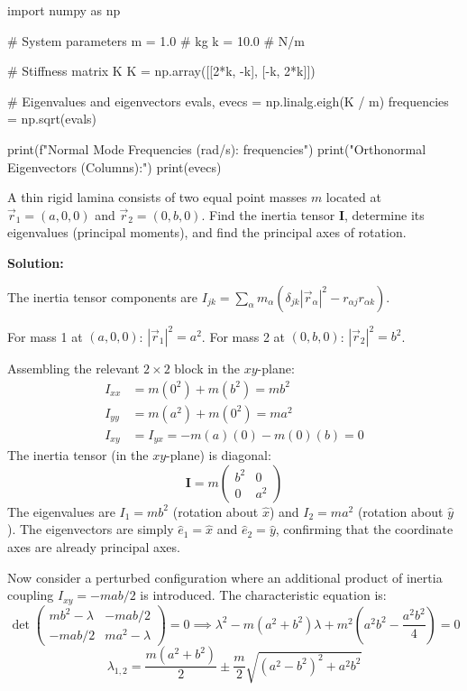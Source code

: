 \begin{pythonbox}
import numpy as np

# System parameters
m = 1.0  # kg
k = 10.0 # N/m

# Stiffness matrix K
K = np.array([[2*k, -k],
              [-k, 2*k]])

# Eigenvalues and eigenvectors
evals, evecs = np.linalg.eigh(K / m)
frequencies = np.sqrt(evals)

print(f"Normal Mode Frequencies (rad/s): {frequencies}")
print("Orthonormal Eigenvectors (Columns):")
print(evecs)
\end{pythonbox}

\begin{psctexample}
A thin rigid lamina consists of two equal point masses $m$ located at $\vec{r}_1 = (a, 0, 0)$ and $\vec{r}_2 = (0, b, 0)$. Find the inertia tensor $\mathbf{I}$, determine its eigenvalues (principal moments), and find the principal axes of rotation.

\textbf{Solution:}

The inertia tensor components are $I_{jk} = \sum_\alpha m_\alpha(\delta_{jk}|\vec{r}_\alpha|^2 - r_{\alpha j}r_{\alpha k})$.

For mass 1 at $(a, 0, 0)$: $|\vec{r}_1|^2 = a^2$.
For mass 2 at $(0, b, 0)$: $|\vec{r}_2|^2 = b^2$.

Assembling the relevant $2\times 2$ block in the $xy$-plane:
\begin{align}
I_{xx} &= m(0^2) + m(b^2) = mb^2 \\
I_{yy} &= m(a^2) + m(0^2) = ma^2 \\
I_{xy} &= I_{yx} = -m(a)(0) - m(0)(b) = 0
\end{align}
The inertia tensor (in the $xy$-plane) is diagonal:
\begin{equation}
\mathbf{I} = m\begin{pmatrix} b^2 & 0 \\ 0 & a^2 \end{pmatrix}
\end{equation}
The eigenvalues are $I_1 = mb^2$ (rotation about $\hat{x}$) and $I_2 = ma^2$ (rotation about $\hat{y}$). The eigenvectors are simply $\hat{e}_1 = \hat{x}$ and $\hat{e}_2 = \hat{y}$, confirming that the coordinate axes are already principal axes.

Now consider a perturbed configuration where an additional product of inertia coupling $I_{xy} = -mab/2$ is introduced. The characteristic equation is:
\begin{equation}
\det\begin{pmatrix} mb^2 - \lambda & -mab/2 \\ -mab/2 & ma^2 - \lambda \end{pmatrix} = 0
\implies \lambda^2 - m(a^2 + b^2)\lambda + m^2\!\left(a^2b^2 - \frac{a^2b^2}{4}\right) = 0
\end{equation}
\begin{equation}
\boxed{\lambda_{1,2} = \frac{m(a^2 + b^2)}{2} \pm \frac{m}{2}\sqrt{(a^2 - b^2)^2 + a^2b^2}}
\end{equation}


\end{psctexample}
